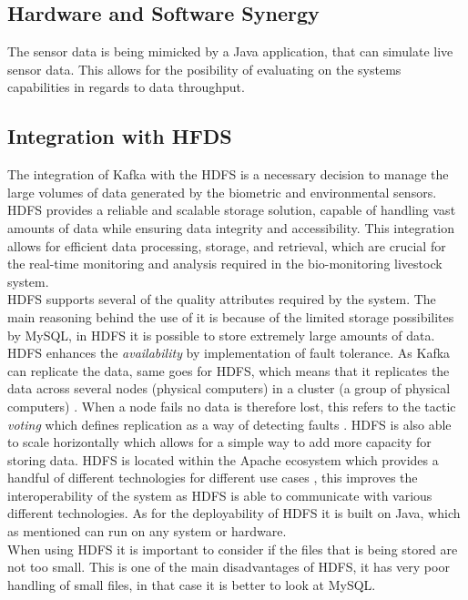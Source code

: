 \subsection{\textbf{Hardware and Software Synergy}}
The sensor data is being mimicked by a Java application, that can simulate live sensor data. This allows for the posibility of evaluating on the systems capabilities in regards to data throughput.

\subsection{\textbf{Integration with HFDS}}
The integration of Kafka with the HDFS is a necessary decision to manage the large volumes of data generated by the biometric and environmental sensors. HDFS provides a reliable and scalable storage solution, capable of handling vast amounts of data while ensuring data integrity and accessibility. This integration allows for efficient data processing, storage, and retrieval, which are crucial for the real-time monitoring and analysis required in the bio-monitoring livestock system. \vspace{2mm} \\
HDFS supports several of the quality attributes required by the system. The main reasoning behind the use of it is because of the limited storage possibilites by MySQL, in HDFS it is possible to store extremely large amounts of data.
HDFS enhances the \textit{availability} by implementation of fault tolerance. As Kafka can replicate the data, same goes for HDFS, which means that it replicates the data across several nodes (physical computers) in a cluster (a group of physical computers) \cite{AltexSoft_2022a}. When a node fails no data is therefore lost, this refers to the tactic \textit{voting} which defines replication as a way of detecting faults \cite{Bass2012Software}.
HDFS is also able to scale horizontally which allows for a simple way to add more capacity for storing data. HDFS is located within the Apache ecosystem which provides a handful of different technologies for different use cases \cite{AltexSoft_2022a}, this improves the interoperability of the system as HDFS is able to communicate with various different technologies. As for the deployability of HDFS it is built on Java, which as mentioned can run on any system or hardware.\vspace{2mm} \\
When using HDFS it is important to consider if the files that is being stored are not too small. This is one of the main disadvantages of HDFS, it has very poor handling of small files, in that case it is better to look at MySQL.
